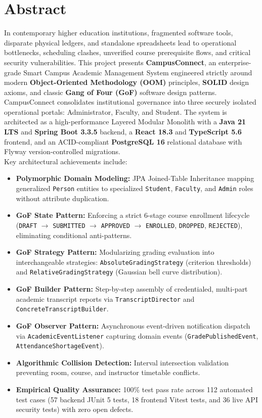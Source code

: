 \documentclass[12pt,a4paper,oneside]{report}
\begin{document}
\chapter*{Abstract}
In contemporary higher education institutions, fragmented software tools, disparate physical ledgers, and standalone spreadsheets lead to operational bottlenecks, scheduling clashes, unverified course prerequisite flows, and critical security vulnerabilities. This project presents \textbf{CampusConnect}, an enterprise-grade Smart Campus Academic Management System engineered strictly around modern \textbf{Object-Oriented Methodology (OOM)} principles, \textbf{SOLID} design axioms, and classic \textbf{Gang of Four (GoF)} software design patterns.\\[0.4cm]
CampusConnect consolidates institutional governance into three securely isolated operational portals: Administrator, Faculty, and Student. The system is architected as a high-performance Layered Modular Monolith with a \textbf{Java 21 LTS} and \textbf{Spring Boot 3.3.5} backend, a \textbf{React 18.3} and \textbf{TypeScript 5.6} frontend, and an ACID-compliant \textbf{PostgreSQL 16} relational database with Flyway version-controlled migrations.\\[0.4cm]
Key architectural achievements include:
\begin{itemize}
    \item \textbf{Polymorphic Domain Modeling:} JPA Joined-Table Inheritance mapping generalized \texttt{Person} entities to specialized \texttt{Student}, \texttt{Faculty}, and \texttt{Admin} roles without attribute duplication.
    \item \textbf{GoF State Pattern:} Enforcing a strict 6-stage course enrollment lifecycle (\texttt{DRAFT} $\to$ \texttt{SUBMITTED} $\to$ \texttt{APPROVED} $\to$ \texttt{ENROLLED}, \texttt{DROPPED}, \texttt{REJECTED}), eliminating conditional anti-patterns.
    \item \textbf{GoF Strategy Pattern:} Modularizing grading evaluation into interchangeable strategies: \texttt{AbsoluteGradingStrategy} (criterion thresholds) and \texttt{RelativeGradingStrategy} (Gaussian bell curve distribution).
    \item \textbf{GoF Builder Pattern:} Step-by-step assembly of credentialed, multi-part academic transcript reports via \texttt{TranscriptDirector} and \texttt{ConcreteTranscriptBuilder}.
    \item \textbf{GoF Observer Pattern:} Asynchronous event-driven notification dispatch via \texttt{AcademicEventListener} capturing domain events (\texttt{GradePublishedEvent}, \texttt{AttendanceShortageEvent}).
    \item \textbf{Algorithmic Collision Detection:} Interval intersection validation preventing room, course, and instructor timetable conflicts.
    \item \textbf{Empirical Quality Assurance:} 100\% test pass rate across 112 automated test cases (57 backend JUnit 5 tests, 18 frontend Vitest tests, and 36 live API security tests) with zero open defects.
\end{itemize}
\end{document}
